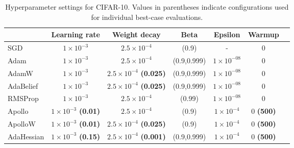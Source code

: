 \begin{table}[h!]
    \centering
    \caption{Hyperparameter settings for CIFAR-10. Values in parentheses indicate configurations used for individual best-case evaluations. }
    \label{tab:cifar-real-comp}
    \begin{tabular}{lcccccc}  %
        \toprule
        & \textbf{Learning rate} & \textbf{Weight decay} & \textbf{Beta} & \textbf{Epsilon} & \textbf{Warmup}  \\
        \midrule
        SGD         & $1 \times 10^{-3}$ & $2.5 \times 10 ^{-4} $ & (0.9) & - & 0  \\
        Adam        & $1 \times 10^{-3}$ & $2.5 \times 10 ^{-4} $ & (0.9,0.999) & $1 \times 10^{-08}$ & 0     \\
        AdamW       & $1 \times 10^{-3}$ & $2.5 \times 10 ^{-4} $ \textbf{(0.025)} & (0.9,0.999) & $1 \times 10^{-08}$ & 0 \\
        AdaBelief   & $1 \times 10^{-3}$ & $2.5 \times 10 ^{-4} $ \textbf{(0.025)} & (0.9,0.999) & $1 \times 10^{-08}$ & 0  \\
        RMSProp     & $1 \times 10^{-3}$ & $2.5 \times 10 ^{-4} $ & (0.99) & $1 \times 10^{-08}$ & 0 \\
        Apollo      & $1 \times 10^{-3}$ \textbf{(0.01)} & $2.5 \times 10 ^{-4}$ & (0.9) & $1 \times 10 ^{-4} $ & 0 \textbf{(500)}\\
        ApolloW     & $1 \times 10^{-3}$ \textbf{(0.01)} & $2.5 \times 10 ^{-4} $ \textbf{(0.025)} & (0.9) & $1 \times 10 ^{-4} $ & 0 \textbf{(500)}  \\
        AdaHessian  & $1 \times 10^{-3}$ \textbf{(0.15)} & $2.5 \times 10 ^{-4}$  \textbf{(0.001)} & (0.9,0.999) &$1 \times 10 ^{-4} $& 0 \textbf{(500)} \\
        \bottomrule
    \end{tabular}
\end{table}

